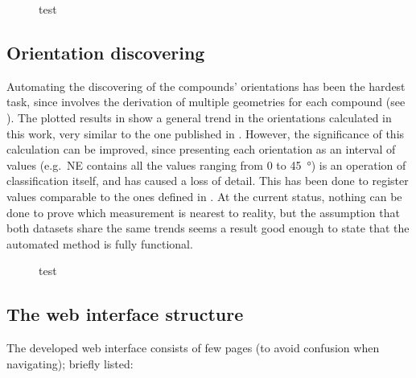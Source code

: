             \begin{figure}[H]
                \centering
                \begin{tikzpicture}
                    
                \end{tikzpicture}
                \caption[test]{test}
                \label{fig:graph-perim}
            \end{figure}

        \subsection{Orientation discovering}

            Automating the discovering of the compounds' orientations has been the hardest task, since involves the derivation of multiple geometries for each compound (see ). The plotted results in  show a general trend in the orientations calculated in this work, very similar to the one published in \cite{laterza}. However, the significance of this calculation can be improved, since presenting each orientation as an interval of values (e.g.\ NE contains all the values ranging from $0$ to \SI{45}{\degree}) is an operation of classification itself, and has caused a loss of detail. This has been done to register values comparable to the ones defined in \cite{laterza}. At the current status, nothing can be done to prove which measurement is nearest to reality, but the assumption that both datasets share the same trends seems a result good enough to state that the automated method is fully functional.

            \begin{figure}[H]
                \centering
                \begin{tikzpicture}
                    
                \end{tikzpicture}
                \caption[test]{test}
                \label{fig:graph-orient}
            \end{figure}

        \subsection{The web interface structure\label{sec:webgis}}
            The developed web interface consists of few pages (to avoid confusion when navigating); briefly listed:

